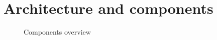 \section{Architecture and components}
\label{sec:arch}

\begin{figure}[h]
    \centering
    \caption{Components overview}
    \label{fig:arch}
\end{figure}




